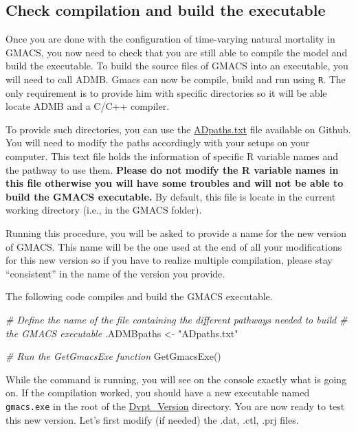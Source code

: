 \documentclass[
]{article}
\newenvironment{Shaded}{\begin{snugshade}}{\end{snugshade}}
\newcommand{\CommentTok}[1]{\textcolor[rgb]{0.56,0.35,0.01}{\textit{#1}}}
\newcommand{\FunctionTok}[1]{\textcolor[rgb]{0.00,0.00,0.00}{#1}}
\newcommand{\NormalTok}[1]{#1}
\newcommand{\OtherTok}[1]{\textcolor[rgb]{0.56,0.35,0.01}{#1}}
\newcommand{\StringTok}[1]{\textcolor[rgb]{0.31,0.60,0.02}{#1}}
\begin{document}
\hypertarget{check-compilation-and-build-the-executable}{%
\subsection{Check compilation and build the
executable}\label{check-compilation-and-build-the-executable}}

Once you are done with the configuration of time-varying natural
mortality in GMACS, you now need to check that you are still able to
compile the model and build the executable. To build the source files of
GMACS into an executable, you will need to call ADMB. Gmacs can now be
compile, build and run using \texttt{R}. The only requirement is to
provide him with specific directories so it will be able locate ADMB and
a C/C++ compiler.

To provide such directories, you can use the
\href{https://github.com/GMACS-project/GMACS_Assessment_code/blob/main/GMACS/ADpaths.txt}{ADpaths.txt}
file available on Github. You will need to modify the paths accordingly
with your setups on your computer. This text file holds the information
of specific R variable names and the pathway to use them. \textbf{Please
do not modify the R variable names in this file otherwise you will have
some troubles and will not be able to build the GMACS executable.} By
default, this file is locate in the current working directory (i.e., in
the GMACS folder).

Running this procedure, you will be asked to provide a name for the new
version of GMACS. This name will be the one used at the end of all your
modifications for this new version so if you have to realize multiple
compilation, please stay ``consistent'' in the name of the version you
provide.

The following code compiles and build the GMACS executable.

\begin{Shaded}
\begin{Highlighting}[]

\CommentTok{\# Define the name of the file containing the different pathways needed to build}
\CommentTok{\# the GMACS executable }
\NormalTok{.ADMBpaths }\OtherTok{\textless{}{-}} \StringTok{"ADpaths.txt"}

\CommentTok{\# Run the GetGmacsExe function}
\FunctionTok{GetGmacsExe}\NormalTok{()}
\end{Highlighting}
\end{Shaded}

While the command is running, you will see on the console exactly what
is going on. If the compilation worked, you should have a new executable
named \texttt{gmacs.exe} in the root of the
\href{https://github.com/GMACS-project/GMACS_Assessment_code/tree/main/GMACS/Dvpt_Version}{Dvpt\_Version}
directory. You are now ready to test this new version. Let's first
modify (if needed) the .dat, .ctl, .prj files.
\end{document}
